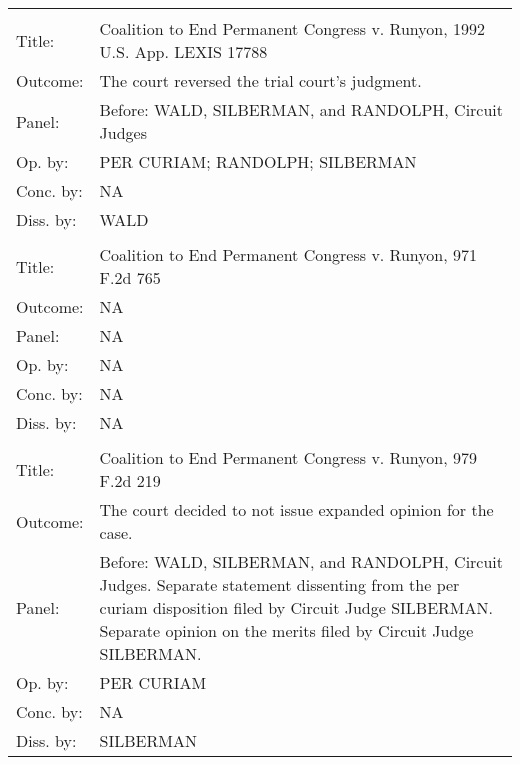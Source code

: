\documentclass[10pt, letterpaper]{article}
\begin{document}
\begin{spacing}{1.0}
\begin{footnotesize}
\begin{longtable}[H]{lp{6in}}
        \arrayrulecolor{black}\hline\\[-4pt]
        Title: & Coalition to End Permanent Congress v. Runyon, 1992 U.S. App. LEXIS 17788\\[2pt]
        Outcome: & The court reversed the trial court's judgment.\\[2pt]
        Panel: & Before: WALD, SILBERMAN, and RANDOLPH, Circuit Judges \\[2pt]
        Op. by: & PER CURIAM; RANDOLPH; SILBERMAN \\[2pt]
        Conc. by: & NA\\[2pt]
        Diss. by: & WALD \\[2pt]
        \arrayrulecolor{gray}\hline\\[-4pt]
        Title: & Coalition to End Permanent Congress v. Runyon, 971 F.2d 765\\[2pt]
        Outcome: & NA\\[2pt]
        Panel: & NA\\[2pt]
        Op. by: & NA\\[2pt]
        Conc. by: & NA\\[2pt]
        Diss. by: & NA\\[2pt]
        \arrayrulecolor{gray}\hline\\[-4pt]
        Title: & Coalition to End Permanent Congress v. Runyon, 979 F.2d 219\\[2pt]
        Outcome: & The court decided to not issue expanded opinion for the case.\\[2pt]
        Panel: & Before: WALD, SILBERMAN, and RANDOLPH, Circuit Judges. Separate statement dissenting from the per curiam disposition filed by Circuit Judge SILBERMAN. Separate opinion on the merits filed by Circuit Judge SILBERMAN.  \\[2pt]
        Op. by: & PER CURIAM \\[2pt]
        Conc. by: & NA\\[2pt]
        Diss. by: & SILBERMAN \\[2pt]
        

\end{longtable}
\end{footnotesize}
\end{spacing}
\end{document}

